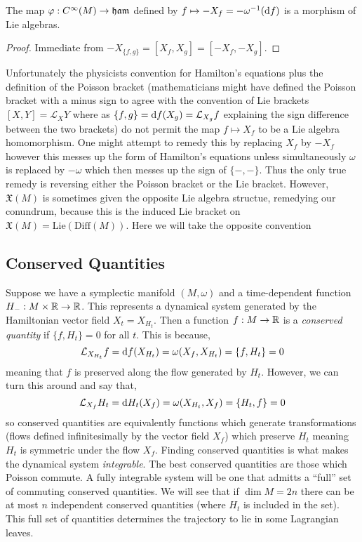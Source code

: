 \documentclass[12pt]{extarticle}
\renewcommand{\L}{\mathcal{L}}
\begin{document}
\begin{proposition}
The map $\varphi : C^\infty(M) \to \mathfrak{ham}$ defined by $f \mapsto -X_f = -\omega^{-1}(\mathrm{d}{f})$ is a morphism of Lie algebras.
\end{proposition}

\begin{proof}
Immediate from $-X_{\{f, g\}} = [X_f, X_g] = [- X_f, - X_g]$. 
\end{proof}

\newcommand{\X}{\mathfrak{X}}

\begin{rmk}
Unfortunately the physicists convention for Hamilton's equations plus the definition of the Poisson bracket (mathematicians might have defined the Poisson bracket with a minus sign to agree with the convention of Lie brackets $[X, Y] = \L_X Y$ where as $\{f, g \} = \d{f}(X_g) = \L_{X_g} f$ explaining the sign difference between the two brackets) do not permit the map $f \mapsto X_f$ to be a Lie algebra homomorphism. One might attempt to remedy this by replacing $X_f$ by $-X_f$ however this messes up the form of Hamilton's equations unless simultaneously $\omega$ is replaced by $-\omega$ which then messes up the sign of $\{ -, - \}$. Thus the only true remedy is reversing either the Poisson bracket or the Lie bracket. However, $\X(M)$ is sometimes given the opposite Lie algebra structue, remedying our conundrum, because this is the induced Lie bracket on $\X(M) = \mathrm{Lie}(\mathrm{Diff}(M))$. Here we will take the opposite convention
\end{rmk}

\subsection{Conserved Quantities}


\renewcommand{\t}{\mathfrak{t}}
\newcommand{\T}{\mathbb{T}}
\newcommand{\h}{\mathfrak{h}}


Suppose we have a symplectic manifold $(M, \omega)$ and a time-dependent function $H_{-} : M \times \mathbb{R} \to \mathbb{R}$. This represents a dynamical system generated by the Hamiltonian vector field $X_t = X_{H_t}$. Then a function $f : M \to \mathbb{R}$ is a \textit{conserved quantity} if $\{ f, H_t \} = 0$ for all $t$. This is because,
\[ \L_{X_{H_t}} f = \d{f}(X_{H_t}) = \omega(X_f, X_{H_t}) = \{ f, H_t \} = 0 \]
meaning that $f$ is preserved along the flow generated by $H_t$. However, we can turn this around and say that,
\[ \L_{X_f} H_t = \d{H_t}(X_f) = \omega(X_{H_t}, X_f) = \{ H_t, f \} = 0 \]
so conserved quantities are equivalently functions which generate transformations (flows defined infinitesimally by the vector field $X_f$) which preserve $H_t$ meaning $H_t$ is symmetric under the flow $X_f$. Finding conserved quantities is what makes the dynamical system \textit{integrable}. The best conserved quantities are those which Poisson commute. A fully integrable system will be one that admitts a ``full'' set of commuting conserved quantities. We will see that if $\dim{M} = 2n$ there can be at most $n$ independent conserved quantities (where $H_t$ is included in the set). This full set of quantities determines the trajectory to lie in some Lagrangian leaves. 
\end{document}
